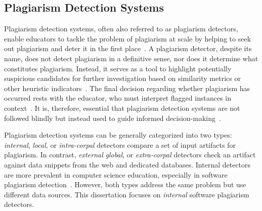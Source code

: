 \subsection{Plagiarism Detection Systems}\label{sec:foundations-pds}
Plagiarism detection systems, often also referred to as plagiarism detectors, enable educators to tackle the problem of plagiarism at scale by helping to seek out plagiarism and deter it in the first place~\cite{Braumoeller2001}. 
A plagiarism detector, despite its name, does not detect plagiarism in a definitive sense, nor does it determine what constitutes plagiarism. Instead, it serves as a tool to highlight potentially suspicious candidates for further investigation based on similarity metrics or other heuristic indicators~\cite{mozgovoy2007}. The final decision regarding whether plagiarism has occurred rests with the educator, who must interpret flagged instances in context~\cite{Prashar20204, Culwin2001}. It is, therefore, essential that plagiarism detection systems are not followed blindly but instead used to guide informed decision-making~\cite{Weber2019, Culwin2001, Saglam2024a}.

Plagiarism detection systems can be generally categorized into two types: \textit{internal}, \textit{local}, or \textit{intra-corpal} detectors compare a set of input artifacts for plagiarism. In contrast, \textit{external} \textit{global}, or \textit{extra-corpal} detectors check an artifact against data snippets from the web and dedicated databases. Internal detectors are more prevalent in computer science education, especially in software plagiarism detection~\cite{Butakov2009, Culwin2001}.
However, both types address the same problem but use different data sources.
This dissertation focuses on \textit{internal} software plagiarism detectors.

